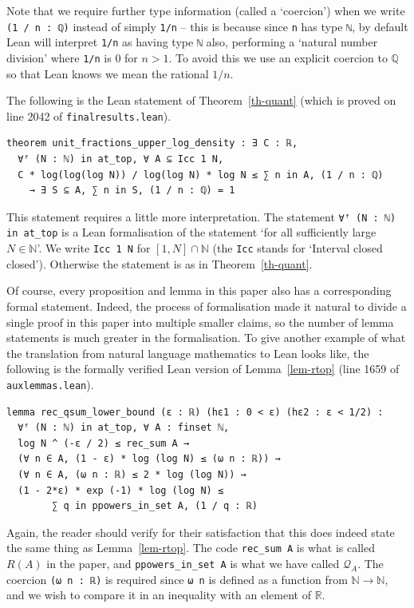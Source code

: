 \documentclass{amsart}
\begin{document}
Note that we require further type information (called a `coercion') when we write \lstinline{(1 / n : ℚ)} instead of simply \lstinline{1/n} -- this is because since \lstinline{n} has type \lstinline{ℕ}, by default Lean will interpret \lstinline{1/n} as having type \lstinline{ℕ} also, performing a `natural number division' where \lstinline{1/n} is 0 for $n > 1$. To avoid this we use an explicit coercion to $\mathbb{Q}$ so that Lean knows we mean the rational $1/n$. 

The following is the Lean statement of Theorem~\ref{th-quant} (which is proved on line 2042 of \texttt{final\textunderscore results.lean}). 
\begin{lstlisting}
theorem unit_fractions_upper_log_density : ∃ C : ℝ,
  ∀ᶠ (N : ℕ) in at_top, ∀ A ⊆ Icc 1 N,
  C * log(log(log N)) / log(log N) * log N ≤ ∑ n in A, (1 / n : ℚ) 
    → ∃ S ⊆ A, ∑ n in S, (1 / n : ℚ) = 1
\end{lstlisting}
This statement requires a little more interpretation. The statement \lstinline{∀ᶠ (N : ℕ) in at_top} is a Lean formalisation of the statement `for all sufficiently large $N\in\mathbb{N}$'. We write \lstinline{Icc 1 N} for $[1,N]\cap \mathbb{N}$ (the \lstinline{Icc} stands for `Interval closed closed'). Otherwise the statement is as in Theorem~\ref{th-quant}. 

Of course, every proposition and lemma in this paper also has a corresponding formal statement. Indeed, the process of formalisation made it natural to divide a single proof in this paper into multiple smaller claims, so the number of lemma statements is much greater in the formalisation. To give another example of what the translation from natural language mathematics to Lean looks like, the following is the formally verified Lean version of Lemma~\ref{lem-rtop} (line 1659 of \texttt{aux\textunderscore lemmas.lean}).

\begin{lstlisting}
lemma rec_qsum_lower_bound (ε : ℝ) (hε1 : 0 < ε) (hε2 : ε < 1/2) :
  ∀ᶠ (N : ℕ) in at_top, ∀ A : finset ℕ,
  log N ^ (-ε / 2) ≤ rec_sum A → 
  (∀ n ∈ A, (1 - ε) * log (log N) ≤ (ω n : ℝ)) → 
  (∀ n ∈ A, (ω n : ℝ) ≤ 2 * log (log N)) → 
  (1 - 2*ε) * exp (-1) * log (log N) ≤ 
        ∑ q in ppowers_in_set A, (1 / q : ℝ)
\end{lstlisting}

Again, the reader should verify for their satisfaction that this does indeed state the same thing as Lemma~\ref{lem-rtop}. The code \lstinline{rec_sum A} is what is called $R(A)$ in the paper, and \lstinline{ppowers_in_set A} is what we have called $\mathcal{Q}_A$. The coercion \lstinline{(ω n : ℝ)} is required since \lstinline{ω n} is defined as a function from $\mathbb{N}\to\mathbb{N}$, and we wish to compare it in an inequality with an element of $\mathbb{R}$.
\end{document}
